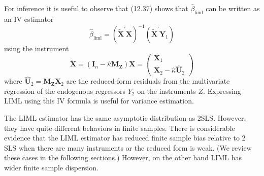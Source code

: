 \documentclass[10pt]{article}
\begin{document}
For inference it is useful to observe that (12.37) shows that $\widehat{\beta}_{\mathrm{liml}}$ can be written as an IV estimator
$$
\widehat{\beta}_{\mathrm{liml}}=\left(\widetilde{\boldsymbol{X}}^{\prime} \boldsymbol{X}\right)^{-1}\left(\widetilde{\boldsymbol{X}}^{\prime} \boldsymbol{Y}_{1}\right)
$$
using the instrument
$$
\widetilde{\boldsymbol{X}}=\left(\boldsymbol{I}_{n}-\widehat{\kappa} \boldsymbol{M}_{\boldsymbol{Z}}\right) \boldsymbol{X}=\left(\begin{array}{c}
\boldsymbol{X}_{1} \\
\boldsymbol{X}_{2}-\widehat{\kappa} \widehat{\boldsymbol{U}}_{2}
\end{array}\right)
$$
where $\widehat{\boldsymbol{U}}_{2}=\boldsymbol{M}_{\boldsymbol{Z}} \boldsymbol{X}_{2}$ are the reduced-form residuals from the multivariate regression of the endogenous regressors $Y_{2}$ on the instruments $Z$. Expressing LIML using this IV formula is useful for variance estimation.

The LIML estimator has the same asymptotic distribution as 2SLS. However, they have quite different behaviors in finite samples. There is considerable evidence that the LIML estimator has reduced finite sample bias relative to 2 SLS when there are many instruments or the reduced form is weak. (We review these cases in the following sections.) However, on the other hand LIML has wider finite sample dispersion.
\end{document}

